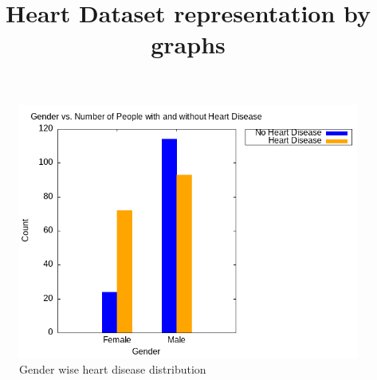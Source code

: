 \documentclass{article}
\title{Heart Dataset representation by graphs}
\begin{document}
	\maketitle
	\begin{figure}[h]
		\centering
		\caption{\label{4a}Gender wise heart disease distribution}
		\includegraphics[scale=0.7]{4a.png}
	\end{figure}
	
\end{document}
